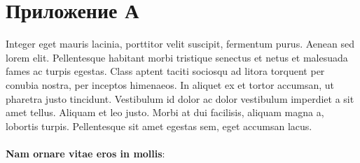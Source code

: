 \clearpage
{}
\section*{Приложение А}
Integer eget mauris lacinia, porttitor velit suscipit, fermentum purus. Aenean sed lorem elit. Pellentesque habitant morbi tristique senectus et netus et malesuada fames ac turpis egestas. Class aptent taciti sociosqu ad litora torquent per conubia nostra, per inceptos himenaeos. In aliquet ex et tortor accumsan, ut pharetra justo tincidunt. Vestibulum id dolor ac dolor vestibulum imperdiet a sit amet tellus. Aliquam et leo justo. Morbi at dui facilisis, aliquam magna a, lobortis turpis. Pellentesque sit amet egestas sem, eget accumsan lacus.
~\\
~\\
\textbf{Nam ornare vitae eros in mollis}:
 
~\\